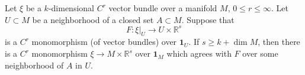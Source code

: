 Let $\xi$ be a $k$-dimensional $C^r$ vector bundle over a manifold $M$, $0 \leqslant r \leqslant \infty$. Let $U \subset M$ be a neighborhood of a closed set $A \subset M$. Suppose that
$$F: \xi|_U \to U \times \mathbb{R}^s$$
is a $C^r$ monomorphism (of vector bundles) over $\mathbf{1}_U$. If $s \geqslant k + \dim M$, then there is a $C^r$ monomorphism $\xi \to M \times \mathbb{R}^s$ over $\mathbf{1}_M$ which agrees with $F$ over some neighborhood of $A$ in $U$.
